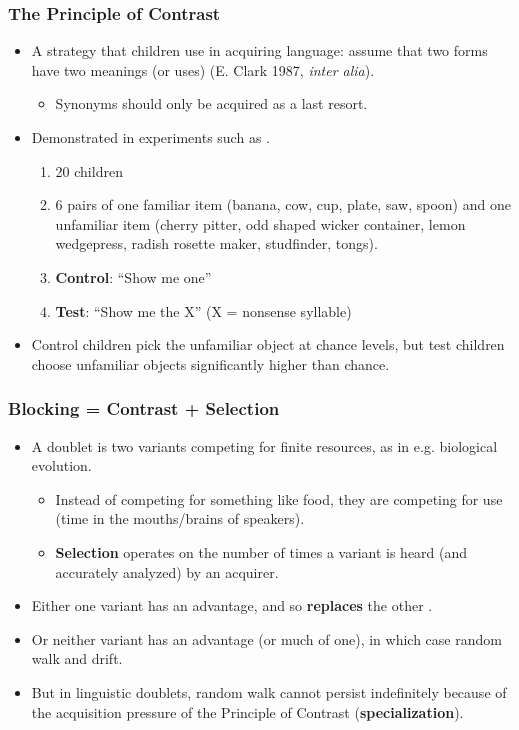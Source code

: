 \documentclass[hyperref={pdfpagelabels=false}]{beamer}
\begin{document}
\begin{frame}
\frametitle{The Principle of Contrast}
\begin{itemize}
	\item A strategy that children use in acquiring language: assume that two forms have two meanings (or uses) (E. Clark 1987, \textsl{inter alia}).
		\begin{itemize} \item Synonyms should only be acquired as a last resort.\end{itemize}
	\item Demonstrated in experiments such as \citet{markmanwachtel1988}.
		\begin{enumerate}
			\item 20 children
			\item 6 pairs of one familiar item (banana, cow, cup, plate, saw, spoon) and one unfamiliar item (cherry pitter, odd shaped wicker container, lemon wedgepress, radish rosette maker, studfinder, tongs).
			\item \textbf{Control}: ``Show me one''
			\item \textbf{Test}: ``Show me the X'' (X = nonsense syllable)
		\end{enumerate}
	\item Control children pick the unfamiliar object at chance levels, but test children choose unfamiliar objects significantly higher than chance.
\end{itemize}
\end{frame}


\begin{frame}
\frametitle{Blocking = Contrast + Selection}
\begin{itemize}
	\item A doublet is two variants competing for finite resources, as in e.g. biological evolution.
		\begin{itemize} 
			\item Instead of competing for something like food, they are competing for use (time in the mouths/brains of speakers). 
			\item \textbf{Selection} operates on the number of times a variant is heard (and accurately analyzed) by an acquirer.
			\end{itemize}
	\item Either one variant has an advantage, and so \textbf{replaces} the other \citep[following a logistic function;][]{nowak2006}.
	\item Or neither variant has an advantage (or much of one), in which case random walk and drift.
	\item But in linguistic doublets, random walk cannot persist indefinitely because of the acquisition pressure of the Principle of Contrast (\textbf{specialization}).
\end{itemize}
\end{frame}
\end{document}
